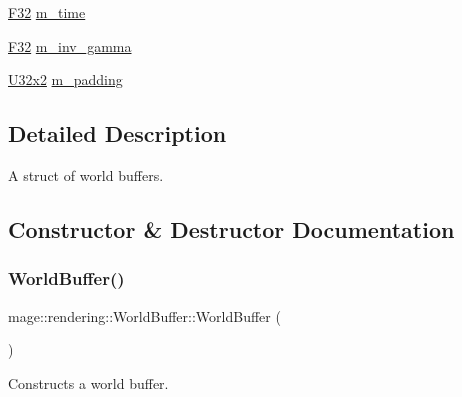 \begin{DoxyCompactItemize}
\item 
\mbox{\hyperlink{namespacemage_aa97e833b45f06d60a0a9c4fc22ae02c0}{F32}} \mbox{\hyperlink{structmage_1_1rendering_1_1_world_buffer_a56f828aba079ff56ef931c1f9c903a38}{m\+\_\+time}}
\item 
\mbox{\hyperlink{namespacemage_aa97e833b45f06d60a0a9c4fc22ae02c0}{F32}} \mbox{\hyperlink{structmage_1_1rendering_1_1_world_buffer_a8362f6c590aca2d17359abd0129a94bd}{m\+\_\+inv\+\_\+gamma}}
\item 
\mbox{\hyperlink{namespacemage_a31f2bb52b5080e706e1c13de07c0a249}{U32x2}} \mbox{\hyperlink{structmage_1_1rendering_1_1_world_buffer_a972a6cd26e8c6402733fe863001c79ed}{m\+\_\+padding}}
\end{DoxyCompactItemize}


\subsection{Detailed Description}
A struct of world buffers. 

\subsection{Constructor \& Destructor Documentation}
\mbox{\label{structmage_1_1rendering_1_1_world_buffer_a7f51349a6ffa759e245230fa26eaf318}} 
\subsubsection{\texorpdfstring{World\+Buffer()}{WorldBuffer()}\hspace{0.1cm}{\footnotesize\ttfamily [1/3]}}
{\footnotesize\ttfamily mage\+::rendering\+::\+World\+Buffer\+::\+World\+Buffer (\begin{DoxyParamCaption}{ }\end{DoxyParamCaption})\hspace{0.3cm}{\ttfamily [noexcept]}}

Constructs a world buffer. \mbox{\label{structmage_1_1rendering_1_1_world_buffer_a70a1f1b062c0548f2ff87db8d78749f2}} 
